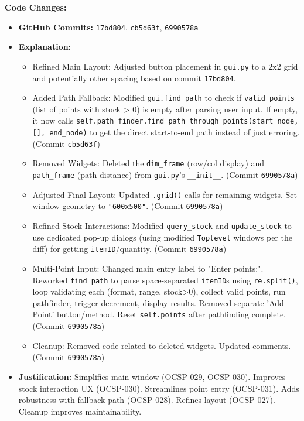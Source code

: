 \textbf{Code Changes:}
\begin{itemize}
	\item \textbf{GitHub Commits:} \verb|17bd804|, \verb|cb5d63f|, \verb|6990578a|
	\item \textbf{Explanation:}
	\begin{itemize}
		\item Refined Main Layout: Adjusted button placement in \verb|gui.py| to a 2x2 grid and potentially other spacing based on commit \verb|17bd804|.
		\item Added Path Fallback: Modified \verb|gui.find_path| to check if \verb|valid_points| (list of points with stock > 0) is empty after parsing user input. If empty, it now calls \verb|self.path_finder.find_path_through_points(start_node, [], end_node)| to get the direct start-to-end path instead of just erroring. (Commit \verb|cb5d63f|)
		\item Removed Widgets: Deleted the \verb|dim_frame| (row/col display) and \verb|path_frame| (path distance) from \verb|gui.py|'s \verb|__init__|. (Commit \verb|6990578a|)
		\item Adjusted Final Layout: Updated \verb|.grid()| calls for remaining widgets. Set window geometry to \verb|"600x500"|. (Commit \verb|6990578a|)
		\item Refined Stock Interactions: Modified \verb|query_stock| and \verb|update_stock| to use dedicated pop-up dialogs (using modified \verb|Toplevel| windows per the diff) for getting \verb|itemID|/quantity. (Commit \verb|6990578a|)
		\item Multi-Point Input: Changed main entry label to "Enter points:". Reworked \verb|find_path| to parse space-separated \verb|itemID|s using \verb|re.split()|, loop validating each (format, range, stock>0), collect valid points, run pathfinder, trigger decrement, display results. Removed separate 'Add Point' button/method. Reset \verb|self.points| after pathfinding complete. (Commit \verb|6990578a|)
		\item Cleanup: Removed code related to deleted widgets. Updated comments. (Commit \verb|6990578a|)
	\end{itemize}
	\item \textbf{Justification:} Simplifies main window (OCSP-029, OCSP-030). Improves stock interaction UX (OCSP-030). Streamlines point entry (OCSP-031). Adds robustness with fallback path (OCSP-028). Refines layout (OCSP-027). Cleanup improves maintainability.
\end{itemize}

